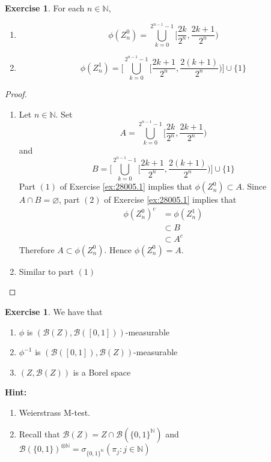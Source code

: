 \documentclass{book}
\theoremstyle{definition}
\newtheorem{ex}[definition]{Exercise}
\newcommand{\sig}{\sigma}
\newcommand{\N}{\mathbb{N}}
\newcommand{\MB}{\mathcal{B}}
\newcommand{\lex}[1]{\label{ex:#1}}
\newcommand{\rex}[1]{Exercise \ref{ex:#1}}
\DeclareMathOperator*{\0}{\mbf{0}}
\DeclareMathOperator*{\1}{\mbf{1}}
\begin{document}
	\begin{ex} \lex{28005.2}
		For each $n \in \N$, 
		\begin{enumerate}
			\item $$\phi(Z_n^0) = \bigcup_{k =0}^{2^{n-1} -1} \bigg[ \frac{2k}{2^n}, \frac{2k+1}{2^n} \bigg)$$
			\item $$\phi(Z_n^1) = \bigg[ \bigcup\limits_{k =0}^{2^{n-1} -1} \bigg[ \frac{2k + 1}{2^n}, \frac{2(k+1)}{2^n} \bigg) \bigg] \cup \{1\}$$
		\end{enumerate}
	\end{ex}
	
	\begin{proof}\
		\begin{enumerate}
			\item Let $n \in \N$. Set 
			$$A =  \bigcup\limits_{k =0}^{2^{n-1} - 1} \bigg[ \frac{2k}{2^n}, \frac{2k+1}{2^n} \bigg)$$ 
			and 
			$$B = \bigg[ \bigcup\limits_{k =0}^{2^{n-1} -1} \bigg[ \frac{2k + 1}{2^n}, \frac{2(k+1)}{2^n} \bigg) \bigg] \cup \{1\}$$ 
			Part $(1)$ of \rex{28005.1} implies that $\phi(Z_n^0) \subset A$. Since $A \cap B = \varnothing$, part $(2)$ of \rex{28005.1} implies that 
			\begin{align*}
				\phi(Z_n^0)^c 
				& = \phi(Z_n^1) \\
				& \subset B \\
				& \subset A^c
			\end{align*} 
			Therefore $A \subset \phi(Z_n^0)$. Hence $\phi(Z_n^0) = A$.
			\item Similar to part $(1)$
		\end{enumerate}
	\end{proof}
	
	\begin{ex} \lex{28006} 
		We have that
		\begin{enumerate}
			\item $\phi$ is $(\MB(Z), \MB([0,1]))$-measurable
			\item $\phi^{-1}$ is $(\MB([0,1]), \MB(Z))$-measurable
			\item $(Z, \MB(Z))$ is a Borel space
		\end{enumerate}
		\textbf{Hint: } \begin{enumerate}
			\item Weierstrass M-test.
			\item Recall that $\MB(Z) = Z \cap \MB(\{0,1\}^{\N})$ and $\MB(\{0,1\})^{\otimes \N} = \sig_{\{0,1\}^{\N}} (\pi_j: j \in \N)$
		\end{enumerate} 
	\end{ex}
	
\end{document}
